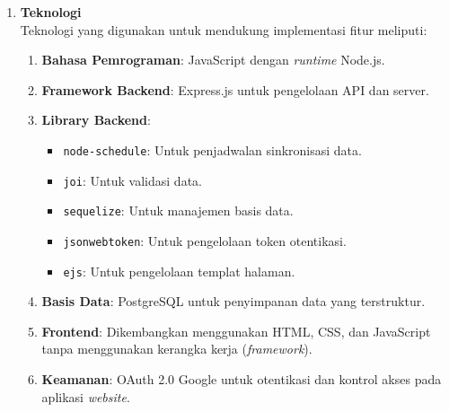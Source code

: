 \begin{enumerate}[label*=\arabic*.,ref=\arabic*]
    \item \textbf{Teknologi}\\
    Teknologi yang digunakan untuk mendukung implementasi fitur meliputi:
    \begin{enumerate}[label=\alph*.]
        \item \textbf{Bahasa Pemrograman}: JavaScript dengan \textit{runtime} Node.js.
        \item \textbf{Framework Backend}: Express.js untuk pengelolaan API dan server.
        \item \textbf{Library Backend}:
        \begin{itemize}
            \item \texttt{node-schedule}: Untuk penjadwalan sinkronisasi data.
            \item \texttt{joi}: Untuk validasi data.
            \item \texttt{sequelize}: Untuk manajemen basis data.
            \item \texttt{jsonwebtoken}: Untuk pengelolaan token otentikasi.
            \item \texttt{ejs}: Untuk pengelolaan templat halaman.
        \end{itemize}
        \item \textbf{Basis Data}: PostgreSQL untuk penyimpanan data yang terstruktur.
        \item \textbf{Frontend}: Dikembangkan menggunakan HTML, CSS, dan JavaScript tanpa menggunakan kerangka kerja (\textit{framework}).
        \item \textbf{Keamanan}: OAuth 2.0 Google untuk otentikasi dan kontrol akses pada aplikasi \textit{website}.
    \end{enumerate}
\end{enumerate}